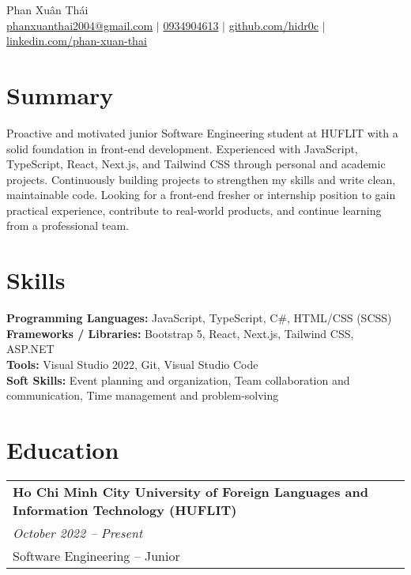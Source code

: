 \documentclass[a4paper,11pt]{article}
\begin{document}
\pagestyle{empty}

\begin{center}
\LARGE{Phan Xuân Thái} \\[5pt]
\small{\href{mailto:phanxuanthai2004@gmail.com}{phanxuanthai2004@gmail.com} $|$ 
\href{tel:0934904613}{0934904613} $|$ 
\href{https://github.com/hidr0c}{\underline{github.com/hidr0c}} $|$ 
\href{https://www.linkedin.com/in/xuân-thái-phan-bab693352/}{\underline{linkedin.com/phan-xuan-thai}} 
} \\[2pt]
\end{center}
\vspace{1.5em}

\section{Summary}
\begin{spacing}{1.05}
Proactive and motivated junior Software Engineering student at HUFLIT with a solid foundation in front-end development. Experienced with JavaScript, TypeScript, React, Next.js, and Tailwind CSS through personal and academic projects. Continuously building projects to strengthen my skills and write clean, maintainable code. Looking for a front-end fresher or internship position to gain practical experience, contribute to real-world products, and continue learning from a professional team.
\end{spacing}

\section{Skills}
\begin{spacing}{1.05}
\textbf{Programming Languages:} JavaScript, TypeScript, C\#, HTML/CSS (SCSS) \\
\textbf{Frameworks / Libraries:} Bootstrap 5, React, Next.js, Tailwind CSS, ASP.NET \\
\textbf{Tools:} Visual Studio 2022, Git, Visual Studio Code \\
\textbf{Soft Skills:} Event planning and organization, Team collaboration and communication, Time management and problem-solving \\
\end{spacing}

\section{Education}
\begin{spacing}{1.05}
\begin{tabularx}{\linewidth}{@{}l@{}}
\textbf{Ho Chi Minh City University of Foreign Languages and Information Technology (HUFLIT)} \\
\small\textit{October 2022 -- Present} \\
Software Engineering -- Junior
\end{tabularx}
\end{spacing}
\end{document}
